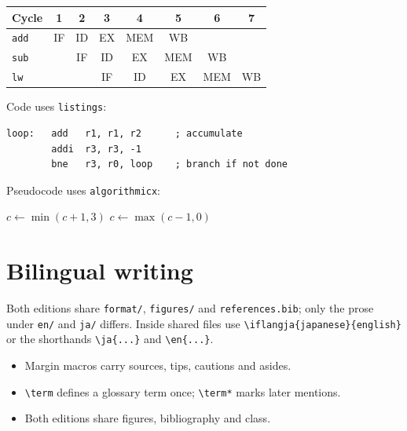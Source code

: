 \documentclass[../main.tex]{subfiles}
\begin{document}
\begin{widefigure}[htbp]
  \begin{tabular}{@{}lccccccc@{}}
    \toprule
    Cycle & 1 & 2 & 3 & 4 & 5 & 6 & 7 \\
    \midrule
    \texttt{add}  & IF & ID & EX & MEM & WB &    &    \\
    \texttt{sub}  &    & IF & ID & EX  & MEM & WB &   \\
    \texttt{lw}   &    &    & IF & ID  & EX  & MEM & WB \\
    \bottomrule
  \end{tabular}
  \caption{A wide float spanning body and margin (\texttt{widefigure}).}
  \label{fig:l01-wide}
\end{widefigure}

Code uses \verb|listings|:
\begin{lstlisting}[language={[x86masm]Assembler}, caption={A loop in assembly.}]
loop:   add   r1, r1, r2      ; accumulate
        addi  r3, r3, -1
        bne   r3, r0, loop    ; branch if not done
\end{lstlisting}

Pseudocode uses \verb|algorithmicx|:
\begin{algorithm}[htbp]
  \caption{Two-bit saturating counter update}
  \begin{algorithmic}[1]
      \State $c \gets \min(c+1, 3)$
    \Else
      \State $c \gets \max(c-1, 0)$
    \EndIf
  \end{algorithmic}
\end{algorithm}

\section{Bilingual writing}

Both editions share \texttt{format/}, \texttt{figures/} and
\texttt{references.bib}; only the prose under \texttt{en/} and \texttt{ja/}
differs.  Inside shared files use \verb|\iflangja{japanese}{english}| or the
shorthands \verb|\ja{...}| and \verb|\en{...}|.

\begin{keypoint}
  \begin{itemize}
    \item Margin macros carry sources, tips, cautions and asides.
    \item \verb|\term| defines a glossary term once; \verb|\term*| marks
      later mentions.
    \item Both editions share figures, bibliography and class.
  \end{itemize}
\end{keypoint}
\end{document}
